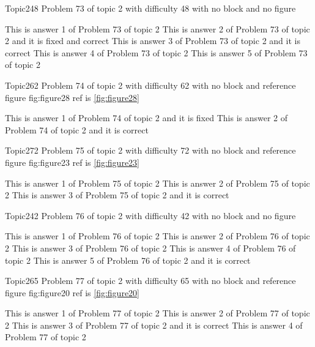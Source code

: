 \documentclass[master]{exam}
\begin{document}
\begin{problem}{Topic2}{48}
	Problem 73 of topic 2 with difficulty 48 with no block and no figure
	\begin{answers}
		\answer This is answer 1 of Problem 73 of topic 2 
		 This is answer 2 of Problem 73 of topic 2 and it is fixed and correct
		\answer[correct] This is answer 3 of Problem 73 of topic 2 and it is correct
		\answer This is answer 4 of Problem 73 of topic 2 
		\answer This is answer 5 of Problem 73 of topic 2 
	\end{answers}
\end{problem}

\begin{problem}{Topic2}{62}
	Problem 74 of topic 2 with difficulty 62 with no block and reference figure fig:figure28 ref is \ref{fig:figure28}
	\begin{answers}
		\answer[fixed] This is answer 1 of Problem 74 of topic 2 and it is fixed
		\answer[correct] This is answer 2 of Problem 74 of topic 2 and it is correct
	\end{answers}
\end{problem}

\begin{problem}{Topic2}{72}
	Problem 75 of topic 2 with difficulty 72 with no block and reference figure fig:figure23 ref is \ref{fig:figure23}
	\begin{answers}
		\answer This is answer 1 of Problem 75 of topic 2 
		\answer This is answer 2 of Problem 75 of topic 2 
		\answer[correct] This is answer 3 of Problem 75 of topic 2 and it is correct
	\end{answers}
\end{problem}

\begin{problem}{Topic2}{42}
	Problem 76 of topic 2 with difficulty 42 with no block and no figure
	\begin{answers}
		\answer This is answer 1 of Problem 76 of topic 2 
		\answer This is answer 2 of Problem 76 of topic 2 
		\answer This is answer 3 of Problem 76 of topic 2 
		\answer This is answer 4 of Problem 76 of topic 2 
		\answer[correct] This is answer 5 of Problem 76 of topic 2 and it is correct
	\end{answers}
\end{problem}

\begin{problem}{Topic2}{65}
	Problem 77 of topic 2 with difficulty 65 with no block and reference figure fig:figure20 ref is \ref{fig:figure20}
	\begin{answers}
		\answer This is answer 1 of Problem 77 of topic 2 
		\answer This is answer 2 of Problem 77 of topic 2 
		\answer[correct] This is answer 3 of Problem 77 of topic 2 and it is correct
		\answer This is answer 4 of Problem 77 of topic 2 
	\end{answers}
\end{problem}
\end{document}
